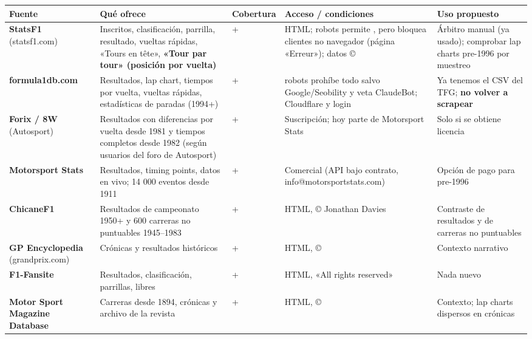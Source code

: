 {\footnotesize\sloppy\setlength{\tabcolsep}{5pt}\renewcommand{\arraystretch}{1.15}
\begin{longtable}{@{}>{\raggedright\arraybackslash}p{0.225\dimexpr(\linewidth-50pt)\relax}>{\raggedright\arraybackslash}p{0.242\dimexpr(\linewidth-50pt)\relax}>{\raggedright\arraybackslash}p{0.048\dimexpr(\linewidth-50pt)\relax}>{\raggedright\arraybackslash}p{0.242\dimexpr(\linewidth-50pt)\relax}>{\raggedright\arraybackslash}p{0.242\dimexpr(\linewidth-50pt)\relax}@{}}
\toprule
\textbf{Fuente} & \textbf{Qué ofrece} & \textbf{Cobertura} & \textbf{Acceso / condiciones} & \textbf{Uso propuesto} \\
\midrule\endhead
\bottomrule\endlastfoot
\textbf{StatsF1} (statsf1.com) & Inscritos, clasificación, parrilla, resultado, vueltas rápidas, «Tours en tête», \textbf{«Tour par tour» (posición por vuelta)} & 1950+ & HTML; robots permite \code{*}, pero bloquea clientes no navegador (página «Erreur»); datos © & Árbitro manual (ya usado); comprobar lap charts pre-1996 por muestreo \\
\textbf{formula1db.com} & Resultados, lap chart, tiempos por vuelta, vueltas rápidas, estadísticas de paradas (1994+) & 1950+ & robots prohíbe todo salvo Google/Seobility y veta ClaudeBot; Cloudflare y login & Ya tenemos el CSV del TFG; \textbf{no volver a scrapear} \\
\textbf{Forix / 8W} (Autosport) & Resultados con diferencias por vuelta desde 1981 y tiempos completos desde 1982 (según usuarios del foro de Autosport) & 1981+ & Suscripción; hoy parte de Motorsport Stats & Solo si se obtiene licencia \\
\textbf{Motorsport Stats} & Resultados, timing points, datos en vivo; 14 000 eventos desde 1911 & 1911+ & Comercial (API bajo contrato, info@motorsportstats.com) & Opción de pago para pre-1996 \\
\textbf{ChicaneF1} & Resultados de campeonato 1950+ y 600 carreras no puntuables 1945–1983 & 1945+ & HTML, © Jonathan Davies & Contraste de resultados y de carreras no puntuables \\
\textbf{GP Encyclopedia} (grandprix.com) & Crónicas y resultados históricos & 1950+ & HTML, © & Contexto narrativo \\
\textbf{F1-Fansite} & Resultados, clasificación, parrillas, libres & 1950+ & HTML, «All rights reserved» & Nada nuevo \\
\textbf{Motor Sport Magazine Database} & Carreras desde 1894, crónicas y archivo de la revista & 1894+ & HTML, © & Contexto; lap charts dispersos en crónicas \\

\end{longtable}}
